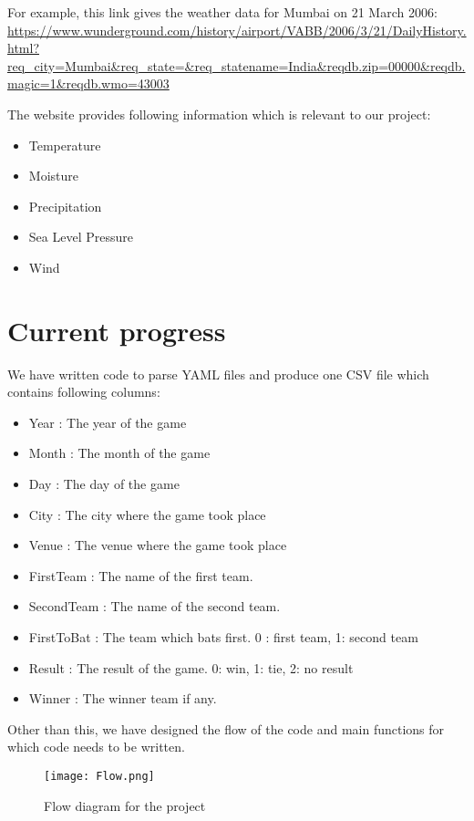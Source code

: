 \documentclass{article}
\begin{document}
For example, this link gives the weather data for Mumbai on 21 March 2006: \url{https://www.wunderground.com/history/airport/VABB/2006/3/21/DailyHistory.html?req_city=Mumbai&req_state=&req_statename=India&reqdb.zip=00000&reqdb.magic=1&reqdb.wmo=43003}

The website provides following information which is relevant to our project:

\begin{itemize}
    \item Temperature
    \item Moisture
    \item Precipitation
    \item Sea Level Pressure
    \item Wind
\end{itemize}

\section{Current progress}

We have written code to parse YAML files and produce one CSV file which contains following columns:

\begin{itemize}
    \item Year : The year of the game
    \item Month : The month of the game
    \item Day : The day of the game
    \item City : The city where the game took place
    \item Venue : The venue where the game took place
    \item FirstTeam : The name of the first team.
    \item SecondTeam : The name of the second team.
    \item FirstToBat : The team which bats first. 0 : first team, 1: second team
    \item Result : The result of the game. 0: win, 1: tie, 2: no result
    \item Winner : The winner team if any.
\end{itemize}

Other than this, we have designed the flow of the code and main functions for which code needs to be written.

\begin{figure}
    \centering
    \texttt{[image: Flow.png]}
    \caption{Flow diagram for the project}
    \label{fig:flow_diagram}
\end{figure}
\end{document}
